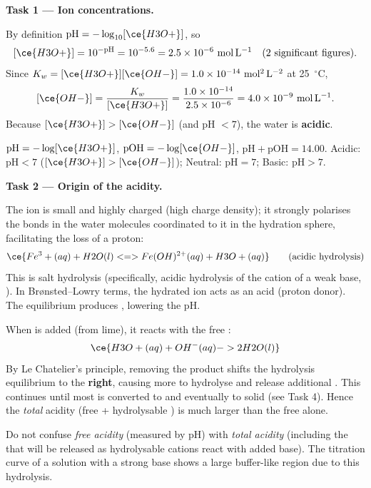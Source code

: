 \documentclass[11pt]{article}
\newcommand{\cle}[1]{{\popxbold\color{popdark}#1}}
\newcounter{popsec}
\newcounter{popsub}
\newcommand{\courssub}[1]{%
  \stepcounter{popsub}%
  \par\vspace{9pt}\noindent{\popxbold\fontsize{11.5}{13}\selectfont\color{popink}{\color{poporange}\thepopsec.\thepopsub}\hspace{6pt}#1}\par\nopagebreak\vspace{4pt}
}
\begin{document}
\courssub{Model answer}

\textbf{Task 1 — Ion concentrations.}

By definition $\mathrm{pH} = -\log_{10}[\ce{H3O+}]$, so
\[
[\ce{H3O+}] = 10^{-\mathrm{pH}} = 10^{-5.6} = 2.5\times10^{-6}\ \mathrm{mol\,L^{-1}} \quad (\text{2 significant figures}).
\]
Since $K_w = [\ce{H3O+}][\ce{OH-}] = 1.0\times10^{-14}\ \mathrm{mol^2\,L^{-2}}$ at \SI{25}{\ensuremath{{}^{\circ}\mathrm{C}}},
\[
[\ce{OH-}] = \frac{K_w}{[\ce{H3O+}]} = \frac{1.0\times10^{-14}}{2.5\times10^{-6}} = 4.0\times10^{-9}\ \mathrm{mol\,L^{-1}}.
\]
Because $[\ce{H3O+}] > [\ce{OH-}]$ (and pH $< 7$), the water is \textbf{acidic}.

\begin{aretenir}
$\mathrm{pH} = -\log[\ce{H3O+}]$, $\mathrm{pOH} = -\log[\ce{OH-}]$, $\mathrm{pH} + \mathrm{pOH} = 14.00$.
Acidic: $\mathrm{pH} < 7$ ($[\ce{H3O+}] > [\ce{OH-}]$); Neutral: $\mathrm{pH} = 7$; Basic: $\mathrm{pH} > 7$.
\end{aretenir}

\textbf{Task 2 — Origin of the acidity.}

The  ion is small and highly charged (high charge density); it strongly polarises the  bonds in the water molecules coordinated to it in the hydration sphere, facilitating the loss of a proton:
\[
\ce{Fe^3+(aq) + H2O(l) <=> Fe(OH)^{2+}(aq) + H3O+(aq)} \qquad (\text{acidic hydrolysis})
\]
This is \cle{salt hydrolysis} (specifically, acidic hydrolysis of the cation of a weak base, ). In Br\o nsted--Lowry terms, the hydrated  ion acts as an \cle{acid} (proton donor). The equilibrium produces , lowering the pH.

When  is added (from lime), it reacts with the free :
\[
\ce{H3O+(aq) + OH^{-}(aq) -> 2H2O(l)}
\]
By \cle{Le Chatelier's principle}, removing the product  shifts the hydrolysis equilibrium to the \textbf{right}, causing more  to hydrolyse and release additional . This continues until most  is converted to  and eventually to solid  (see Task 4). Hence the \emph{total} acidity (free  + hydrolysable ) is much larger than the free  alone.

\begin{attention}
Do not confuse \emph{free acidity} (measured by pH) with \emph{total acidity} (including the  that will be released as hydrolysable cations react with added base). The titration curve of a  solution with a strong base shows a large buffer-like region due to this hydrolysis.
\end{attention}
\end{document}
